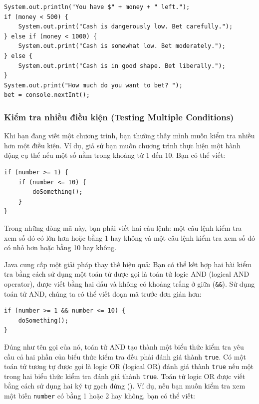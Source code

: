 \begin{verbatim}
System.out.println("You have $" + money + " left.");
if (money < 500) {
    System.out.print("Cash is dangerously low. Bet carefully.");
} else if (money < 1000) {
    System.out.print("Cash is somewhat low. Bet moderately.");
} else {
    System.out.print("Cash is in good shape. Bet liberally.");
}
System.out.print("How much do you want to bet? ");
bet = console.nextInt();
\end{verbatim}

\subsubsection{Kiểm tra nhiều điều kiện (Testing Multiple
Conditions)}\label{kiux1ec3m-tra-nhiux1ec1u-ux111iux1ec1u-kiux1ec7n-testing-multiple-conditions}

Khi bạn đang viết một chương trình, bạn thường thấy mình muốn kiểm tra
nhiều hơn một điều kiện. Ví dụ, giả sử bạn muốn chương trình thực hiện
một hành động cụ thể nếu một số nằm trong khoảng từ 1 đến 10. Bạn có thể
viết:

\begin{verbatim}
if (number >= 1) {
    if (number <= 10) {
        doSomething();
    }
}
\end{verbatim}

Trong những dòng mã này, bạn phải viết hai câu lệnh: một câu lệnh kiểm
tra xem số đó có lớn hơn hoặc bằng 1 hay không và một câu lệnh kiểm tra
xem số đó có nhỏ hơn hoặc bằng 10 hay không.

Java cung cấp một giải pháp thay thế hiệu quả: Bạn có thể kết hợp hai
bài kiểm tra bằng cách sử dụng một toán tử được gọi là toán tử logic AND
(logical AND operator), được viết bằng hai dấu và không có khoảng trắng
ở giữa (\texttt{\&\&}). Sử dụng toán tử AND, chúng ta có thể viết đoạn
mã trước đơn giản hơn:

\begin{verbatim}
if (number >= 1 && number <= 10) {
    doSomething();
}
\end{verbatim}

Đúng như tên gọi của nó, toán tử AND tạo thành một biểu thức kiểm tra
yêu cầu cả hai phần của biểu thức kiểm tra đều phải đánh giá thành
\texttt{true}. Có một toán tử tương tự được gọi là logic OR (logical OR)
đánh giá thành \texttt{true} nếu một trong hai biểu thức kiểm tra đánh
giá thành \texttt{true}. Toán tử logic OR được viết bằng cách sử dụng
hai ký tự gạch đứng (\texttt{\textbar{}\textbar{}}). Ví dụ, nếu bạn muốn
kiểm tra xem một biến \texttt{number} có bằng 1 hoặc 2 hay không, bạn có
thể viết:


